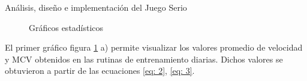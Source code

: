 \begin{thesischapter}{2} {Análisis, diseño e implementación del Juego Serio}
    \begin{figure}[ht]
        \centering

        \caption{Gráficos estadísticos}
        \label{fig: statics-graphs}
    \end{figure}

    El primer gráfico figura \ref{fig: statics-graphs} a) permite visualizar los valores promedio de velocidad y MCV
    obtenidos en las rutinas de entrenamiento diarias. Dichos valores se obtuvieron a partir de las ecuaciones \ref{eq: 2}, \ref{eq: 3}.    
    

\end{thesischapter}
